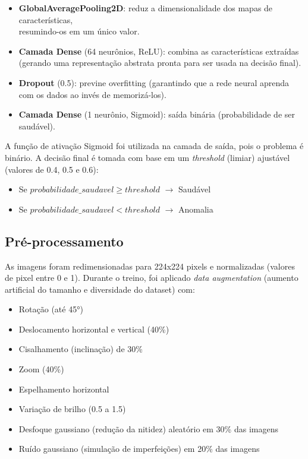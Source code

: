 \documentclass[11pt,a4paper]{article}
\begin{document}
\begin{itemize}
    \item \textbf{GlobalAveragePooling2D}\allowbreak: reduz a dimensionalidade dos mapas de características,\\resumindo-os em um único valor.
    \item \textbf{Camada Dense} (64 neurônios, ReLU): combina as características extraídas (gerando uma representação abstrata pronta para ser usada na decisão final).
    \item \textbf{Dropout} (0.5): previne overfitting (garantindo que a rede neural aprenda com os dados ao invés de memorizá-los).
    \item \textbf{Camada Dense} (1 neurônio, Sigmoid): saída binária (probabilidade de ser saudável).
\end{itemize}

A função de ativação Sigmoid foi utilizada na camada de saída, pois o problema é binário. A decisão final é tomada com base em um \textit{threshold} (limiar) ajustável (valores de 0.4, 0.5 e 0.6):

\begin{itemize}
    \item Se $probabilidade\_saudavel \geq threshold$ $\rightarrow$ Saudável
    \item Se $probabilidade\_saudavel < threshold$ $\rightarrow$ Anomalia
\end{itemize}

\subsection{Pré-processamento}

As imagens foram redimensionadas para 224x224 pixels e normalizadas (valores de pixel entre 0 e 1). Durante o treino, foi aplicado \textit{data augmentation} (aumento artificial do tamanho e diversidade do dataset) com:

\begin{itemize}
    \item Rotação (até 45°)
    \item Deslocamento horizontal e vertical (40\%)
    \item Cisalhamento (inclinação) de 30\%
    \item Zoom (40\%)
    \item Espelhamento horizontal
    \item Variação de brilho (0.5 a 1.5)
    \item Desfoque gaussiano (redução da nitidez) aleatório em 30\% das imagens
    \item Ruído gaussiano (simulação de imperfeições) em 20\% das imagens
\end{itemize}
\end{document}
